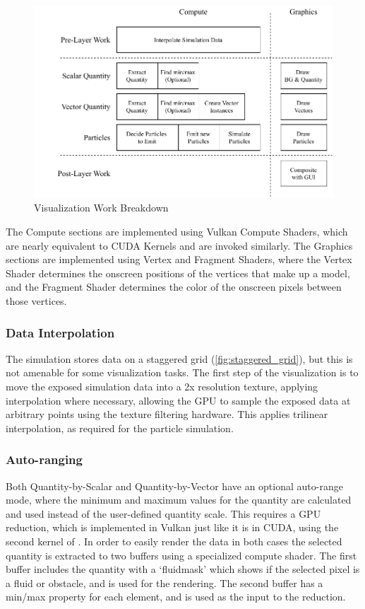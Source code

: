 \begin{figure}
    \centering
    \includegraphics[width=\linewidth]{Ch42Design/figures/FinalReport_VizWork.pdf}
    \caption{Visualization Work Breakdown}
    \label{fig:VizBreakdown}
\end{figure}

The Compute sections are implemented using Vulkan Compute Shaders\cite{TheKhronosGroupVulkanSpec}, which are nearly equivalent to CUDA Kernels and are invoked similarly.
The Graphics sections are implemented using Vertex and Fragment Shaders, where the Vertex Shader determines the onscreen positions of the vertices that make up a model, and the Fragment Shader determines the color of the onscreen pixels between those vertices.

\subsubsection{Data Interpolation}
The simulation stores data on a staggered grid (\cref{fig:staggered_grid}), but this is not amenable for some visualization tasks.
The first step of the visualization is to move the exposed simulation data into a 2x resolution texture, applying interpolation where necessary, allowing the GPU to sample the exposed data at arbitrary points using the texture filtering hardware.
This applies trilinear interpolation, as required for the particle simulation.

\subsubsection{Auto-ranging}
Both Quantity-by-Scalar and Quantity-by-Vector have an optional auto-range mode, where the minimum and maximum values for the quantity are calculated and used instead of the user-defined quantity scale.
This requires a GPU reduction, which is implemented in Vulkan just like it is in CUDA, using the second kernel of \cite{CUDAParallelReduction}.
In order to easily render the data in both cases the selected quantity is extracted to two buffers using a specialized compute shader.
The first buffer includes the quantity with a `fluidmask' which shows if the selected pixel is a fluid or obstacle, and is used for the rendering.
The second buffer has a min/max property for each element, and is used as the input to the reduction.

